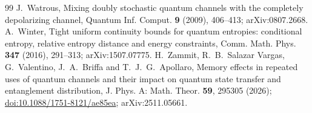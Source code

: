 \documentclass[11pt,a4paper]{article}
\theoremstyle{plain}
\theoremstyle{definition}
\theoremstyle{remark}
\begin{document}
\begin{thebibliography}{99}
 J.~Watrous, Mixing doubly stochastic quantum channels with the completely depolarizing channel, Quantum Inf. Comput. \textbf{9} (2009), 406--413; arXiv:0807.2668.
 A.~Winter, Tight uniform continuity bounds for quantum entropies: conditional entropy, relative entropy distance and energy constraints, Comm. Math. Phys. \textbf{347} (2016), 291--313; arXiv:1507.07775.
 H.~Zammit, R.~B.~Salazar Vargas, G.~Valentino, J.~A.~Briffa and T.~J.~G.~Apollaro, Memory effects in repeated uses of quantum channels and their impact on quantum state transfer and entanglement distribution, J. Phys. A: Math. Theor. \textbf{59}, 295305 (2026); \href{https://doi.org/10.1088/1751-8121/ae85ea}{doi:10.1088/1751-8121/ae85ea}; arXiv:2511.05661.
\end{thebibliography}
\end{document}
